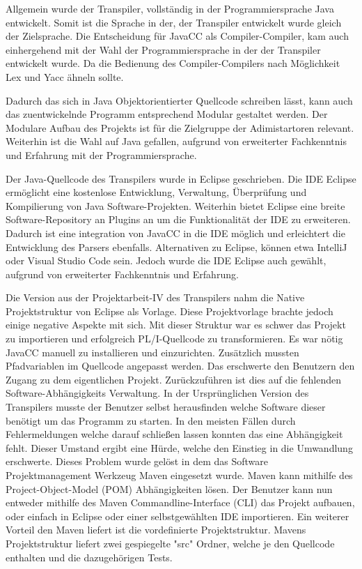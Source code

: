 Allgemein wurde der Transpiler, vollständig in der Programmiersprache Java entwickelt. Somit ist die Sprache in der, der Transpiler entwickelt wurde gleich der Zielsprache. Die Entscheidung für JavaCC als Compiler-Compiler, kam auch einhergehend mit der Wahl der Programmiersprache in der der Transpiler entwickelt wurde. Da die Bedienung des Compiler-Compilers nach Möglichkeit Lex und Yacc ähneln sollte.

Dadurch das sich in Java Objektorientierter Quellcode schreiben lässt, kann auch das zuentwickelnde Programm entsprechend Modular gestaltet werden. Der Modulare Aufbau des Projekts ist für die Zielgruppe der Adimistartoren relevant. 
Weiterhin ist die Wahl auf Java gefallen, aufgrund von erweiterter Fachkenntnis und Erfahrung mit der Programmiersprache.

Der Java-Quellcode des Transpilers wurde in Eclipse geschrieben. Die IDE Eclipse ermöglicht eine kostenlose Entwicklung, Verwaltung, Überprüfung und Kompilierung von Java Software-Projekten. Weiterhin bietet Eclipse eine breite Software-Repository an Plugins an um die Funktionalität der IDE zu erweiteren. Dadurch ist eine integration von JavaCC in die IDE möglich und erleichtert die Entwicklung des Parsers ebenfalls. 
Alternativen zu Eclipse, können etwa IntelliJ oder Visual Studio Code sein. Jedoch wurde die IDE Eclipse auch gewählt, aufgrund von erweiterter Fachkenntnis und Erfahrung.

Die Version aus der Projektarbeit-IV des Transpilers nahm die Native Projektstruktur von Eclipse als Vorlage. Diese Projektvorlage brachte jedoch einige negative Aspekte mit sich. Mit dieser Struktur war es schwer das Projekt zu importieren und erfolgreich PL/I-Quellcode zu transformieren. Es war nötig JavaCC manuell zu installieren und einzurichten. Zusätzlich mussten Pfadvariablen im Quellcode angepasst werden. Das erschwerte den Benutzern den Zugang zu dem eigentlichen Projekt.
Zurückzuführen ist dies auf die fehlenden Software-Abhängigkeits Verwaltung. In der Ursprünglichen Version des Transpilers musste der Benutzer selbst herausfinden welche Software dieser benötigt um das Programm zu starten. In den meisten Fällen durch Fehlermeldungen welche darauf schließen lassen konnten das eine Abhängigkeit fehlt. Dieser Umstand ergibt eine Hürde, welche den Einstieg in die Umwandlung erschwerte. 
Dieses Problem wurde gelöst in dem das Software Projektmanagement Werkzeug Maven eingesetzt wurde. Maven kann mithilfe des Project-Object-Model (POM) Abhängigkeiten lösen. Der Benutzer kann nun entweder mithilfe des Maven Commandline-Interface (CLI) das Projekt aufbauen, oder einfach in Eclipse oder einer selbstgewählten IDE importieren.
Ein weiterer Vorteil den Maven liefert ist die vordefinierte Projektstruktur. Mavens Projektstruktur liefert zwei gespiegelte "src" Ordner, welche je den Quellcode enthalten und die dazugehörigen Tests.

